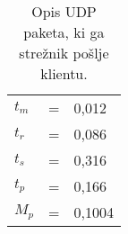 
\begin{table}[!h]
	\centering
	\begin{footnotesize}
		\begin{tabular}{|l c l|}
		\hline
		$ t_m $ & = & 0,012 \\
		$ t_r $ & = & 0,086 \\
		$ t_s $ & = & 0,316 \\
		$ t_p $ & = & 0,166 \\
		$ M_p $ & = & 0,1004 \\
		\hline
		\end{tabular}
	\end{footnotesize}
	\caption{Opis UDP paketa, ki ga stre\v{z}nik po\v{s}lje klientu.}
	\label{table:vel_stepy}
\end{table}